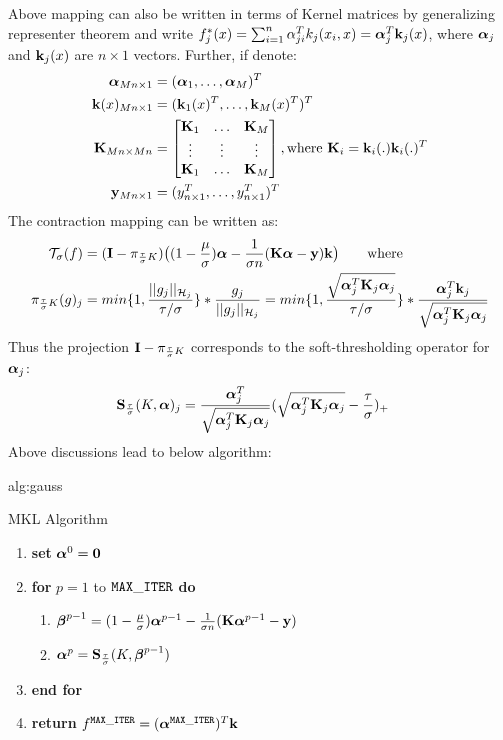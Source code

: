 \documentclass[tablecaption=bottom,wcp]{jmlr} %
\begin{document}
Above mapping can also be written in terms of Kernel matrices by  generalizing representer theorem and write $f_j^*(x) = \sum_{i=1}^n \alpha_{ji}^Tk_j(x_i, x) = \boldsymbol{\alpha}_j^T{\bf k}_j(x)$, where $\boldsymbol{\alpha}_j$ and ${\bf k}_j(x)$ are $n \times 1$ vectors. Further, if denote:
\begin{align*}
\boldsymbol{\alpha}_{Mn \times 1} &= (\boldsymbol{\alpha}_1, \dots, \boldsymbol{\alpha}_M)^T\\
{\bf k}(x)_{Mn \times 1} &= ({\bf k}_1(x)^T, \dots, {\bf k}_M(x)^T)^T\\
{\bf K}_{Mn \times Mn} &= 
\begin{bmatrix}
{\bf K}_1 & \dots & {\bf K}_M\\
\vdots & \vdots & \vdots\\
{\bf K}_1 & \dots & {\bf K}_M
\end{bmatrix}
, \mbox{where }{\bf K}_i = {\bf k}_i(.){\bf k}_i(.)^T\\
{\bf y}_{Mn \times 1} &= (y_{n \times 1}^T, \dots, y_{n \times 1}^T)^T
\end{align*}
The contraction mapping can be written as:
\begin{align*}
{\cal T}_\sigma(f) &= ({\bf I} - \pi_{\frac{\tau}{\sigma}K}) 
\big( (1-\frac{\mu}{\sigma})\boldsymbol{\alpha} - \frac{1}{\sigma n}({\bf K}\boldsymbol{\alpha} - {\bf y}){\bf k}  \big) \qquad \mbox{where}\\
\pi_{\frac{\tau}{\sigma}K}(g)_j &= 
min\{1, \frac{||g_j||_{{\cal H}_j}}{\tau/\sigma}\} * \frac{g_j}{||g_j||_{{\cal H}_j}} = 
min\{1, \frac{\sqrt{\boldsymbol{\alpha}^T_j{\bf K}_j\boldsymbol{\alpha}_j}}{\tau/\sigma}\} * \frac{\boldsymbol{\alpha}_j^T{\bf k}_j}{\sqrt{\boldsymbol{\alpha}^T_j{\bf K}_j\boldsymbol{\alpha}_j}}
\end{align*}
Thus the projection ${\bf I} - \pi_{\frac{\tau}{\sigma}K}$ corresponds to the soft-thresholding operator for $\boldsymbol{\alpha}_j$:
\begin{align*}
{\bf S}_{\frac{\tau}{\sigma}}(K, \boldsymbol{\alpha})_j &= 
\frac{\boldsymbol{\alpha}_j^T}{\sqrt{\boldsymbol{\alpha}^T_j{\bf K}_j\boldsymbol{\alpha}_j}}
(\sqrt{\boldsymbol{\alpha}^T_j{\bf K}_j\boldsymbol{\alpha}_j} - \frac{\tau}{\sigma})_+
\end{align*}
Above discussions lead to below algorithm:
\begin{algorithm}[htbp]
\floatconts
  {alg:gauss}%
  {\caption{MKL Algorithm}}%
{%
\begin{enumerate}
  \item[] \textbf{set} $\boldsymbol{\alpha}^0={\bf 0}$
  \item[] \textbf{for} $p=1$ to ${\tt MAX\_ITER}$ \textbf{do}
  \begin{enumerate}
  \item[] $\boldsymbol{\beta}^{p-1} = (1-\frac{\mu}{\sigma})\boldsymbol{\alpha}^{p-1} - \frac{1}{\sigma n}({\bf K}\boldsymbol{\alpha}^{p-1} - {\bf y}) $
  \item[] $\boldsymbol{\alpha}^p = {\bf S}_{\frac{\tau}{\sigma}}(K, \boldsymbol{\beta}^{p-1})$
  \end{enumerate}
  \item[] \textbf{end for}
  \item[] \textbf{return} $f^{\tt MAX\_ITER} = (\boldsymbol{\alpha}^{\tt MAX\_ITER})^T{\bf k}$
\end{enumerate}
}%
\end{algorithm}
\end{document}
